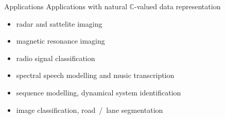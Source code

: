 \documentclass{beamer}
\newcommand{\cplx}{\mathbb{C}}
\begin{document}
\begin{frame}[c]{Applications}{\insertsection}
  Applications with natural $\cplx$-valued data representation
  \bigskip
  \begin{itemize}
    \smallskip
    \item radar and sattelite imaging
      \citep{hirose_complex-valued_2009,hansch_complex-valued_2010,zhang_complex-valued_2017}
    \smallskip
    \item magnetic resonance imaging
      \citep{hui_mri_1995,wang_deepcomplexmri_2020}
    \smallskip
    \item radio signal classification \citep{yang_complex_2019,tarver_design_2019}
    \smallskip
    \item spectral speech modelling and music transcription
      \citep{wisdom_full-capacity_2016,trabelsi_deep_2018,yang_complex_2019}
    \smallskip
    \item sequence modelling, dynamical system identification
      \citep{danihelka_associative_2016,wisdom_full-capacity_2016}
    \smallskip
    \item image classification, road~/~lane segmentation  %
      \citep{popa_complex-valued_2017,trabelsi_deep_2018,gaudet_deep_2018}
  \end{itemize}
\end{frame}
\end{document}
